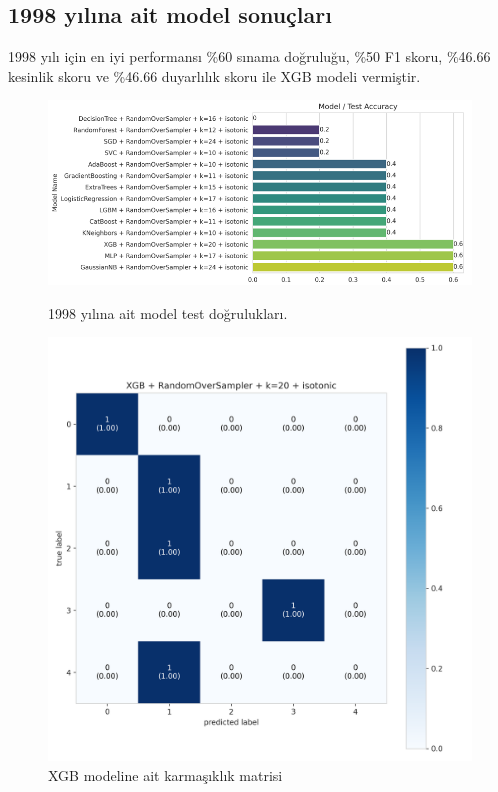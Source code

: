 \newpage

\subsection{1998 yılına ait model sonuçları}
1998 yılı için en iyi performansı \%60 sınama doğruluğu,  \%50 F1 skoru, \%46.66 kesinlik skoru ve \%46.66 duyarlılık skoru ile XGB modeli vermiştir.

\begin{figure}[ht]
\centering
\begin{minipage}[b]{0.6\textwidth}
    \centering
    \includegraphics[width=\textwidth]{1998.png}
    \caption{1998 yılına ait model test doğrulukları.}
    \label{fig:resim1}
\end{minipage}
\hfill
\begin{minipage}[b]{0.6\textwidth}
    \centering
    \includegraphics[width=\textwidth]{1998_cm.png}
    \caption{XGB modeline ait karmaşıklık matrisi}
    \label{fig:resim2}
\end{minipage}
\end{figure}

